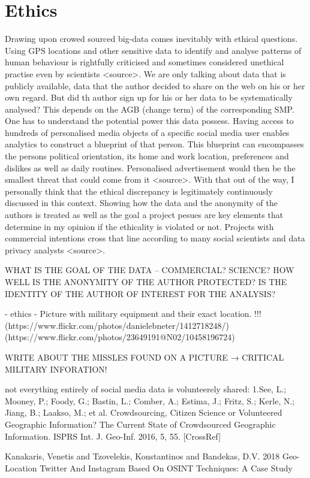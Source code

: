\chapter{Ethics}

Drawing upon crowed sourced big-data comes inevitably with ethical questions. Using GPS locations and other sensitive data to identify and analyse patterns of human behaviour is rightfully criticised and sometimes considered unethical practise even by scientists <source>.
We are only talking about data that is publicly available, data that the author decided to share on the web on his or her own regard. But did th author sign up for his or her data to be systematically analysed? This depends on the AGB (change term) of the corresponding SMP.
One has to understand the potential power this data possess. Having access to hundreds of personalised media objects of a specific social media user enables analytics to construct a blueprint of that person. This blueprint can encompasses the persons political orientation, its  home and work location, preferences and dislikes as well as daily routines. Personalised advertisement would then be the smallest threat that could come from it <source>.
With that out of the way, I personally think that the ethical discrepancy is legitimately continuously discussed in this context. Showing how the data and the anonymity of the authors is treated as well as the goal a project pesues are key elements that determine in my opinion if the ethicality is violated or not. Projects with commercial intentions cross that line according to many social scientists and data privacy analysts <source>. 

WHAT IS THE GOAL OF THE DATA – COMMERCIAL? SCIENCE?
HOW WELL IS THE ANONYMITY OF THE AUTHOR PROTECTED?
IS THE IDENTITY OF THE AUTHOR OF INTEREST FOR THE ANALYSIS?

- ethics - Picture with military equipment and their exact location. !!!
(https://www.flickr.com/photos/danielebneter/1412718248/)
(https://www.flickr.com/photos/23649191@N02/10458196724)


WRITE ABOUT THE MISSLES FOUND ON A PICTURE → CRITICAL MILITARY INFORATION!

not everything entirely of social media data is volunteerely shared:
1.See, L.; Mooney, P.; Foody, G.; Bastin, L.; Comber, A.; Estima, J.; Fritz, S.; Kerle, N.; Jiang, B.; Laakso, M.; et al. Crowdsourcing, Citizen Science or Volunteered Geographic Information? The Current State of Crowdsourced Geographic Information. ISPRS Int. J. Geo-Inf. 2016, 5, 55. [CrossRef]

Kanakaris, Venetis and Tzovelekis, Konstantinos and Bandekas, D.V. 2018
Geo-Location Twitter And Instagram Based On OSINT Techniques: A Case Study

